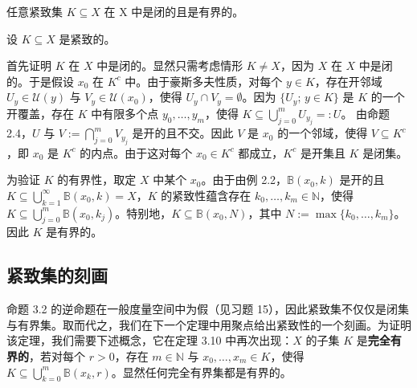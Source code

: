 \begin{proposition}

任意紧致集 $ K \subseteq X $ 在 X 中是闭的且是有界的。

\proofhead
设 $ K \subseteq X $ 是紧致的。

\begin{subitems}
\item

首先证明 $K$ 在 $X$ 中是闭的。显然只需考虑情形 $K \neq X$，因为 $X$ 在 $X$ 中是闭的。于是假设 $x_0$ 在 $K^c$ 中。由于豪斯多夫性质，对每个 $y \in K$，存在开邻域 $U_y \in \mathcal{U}(y)$ 与 $V_y \in \mathcal{U}(x_0)$，使得 $U_y \cap V_y = \emptyset$。因为 $\{U_y ; \, y \in K\}$ 是 $K$ 的一个开覆盖，存在 $K$ 中有限多个点 $y_0, \ldots, y_m$，使得 $K \subseteq \bigcup_{j=0}^m U_{y_j} =: U$。
由命题 2.4，$U$ 与 $V := \bigcap_{j=0}^{m} V_{y_j}$ 是开的且不交。因此 $V$ 是 $x_0$ 的一个邻域，使得 $V \subseteq K^c$，即 $x_0$ 是 $K^c$ 的内点。由于这对每个 $x_0 \in K^c$ 都成立，$K^c$ 是开集且 $K$ 是闭集。

\item

为验证 $K$ 的有界性，取定 $X$ 中某个 $x_0$。由于由例 2.2，$\mathbb{B}(x_0, k)$ 是开的且 $K \subseteq \bigcup_{k=1}^{\infty} \mathbb{B}(x_0, k) = X$，$K$ 的紧致性蕴含存在 $k_0, \ldots, k_m \in \mathbb{N}$，使得 $K \subseteq \bigcup_{j=0}^{m} \mathbb{B}(x_0, k_j)$。特别地，$K \subseteq \mathbb{B}(x_0, N)$，其中 $N := \max\{k_0, \ldots, k_m\}$。因此 $K$ 是有界的。

\end{subitems}

\end{proposition}

\subsection*{紧致集的刻画}

命题 3.2 的逆命题在一般度量空间中为假（见习题 15），因此紧致集不仅仅是闭集与有界集。取而代之，我们在下一个定理中用聚点给出紧致性的一个刻画。为证明该定理，我们需要下述概念，它在定理 3.10 中再次出现：$ X $ 的子集 $ K $ 是\textbf{完全有界的}，若对每个 $ r > 0 $，存在 $ m \in \mathbb{N} $ 与 $ x_0, \ldots, x_m \in K $，使得 $ K \subseteq \bigcup_{k=0}^{m} \mathbb{B}(x_k, r) $。显然任何完全有界集都是有界的。

